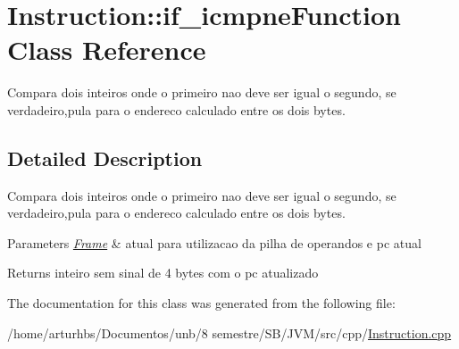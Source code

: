 \hypertarget{classInstruction_1_1if__icmpneFunction}{}\section{Instruction\+:\+:if\+\_\+icmpne\+Function Class Reference}
\label{classInstruction_1_1if__icmpneFunction}


Compara dois inteiros onde o primeiro nao deve ser igual o segundo, se verdadeiro,pula para o endereco calculado entre os dois bytes.  




\subsection{Detailed Description}
Compara dois inteiros onde o primeiro nao deve ser igual o segundo, se verdadeiro,pula para o endereco calculado entre os dois bytes. 


\begin{DoxyParams}{Parameters}
{\em \hyperlink{classFrame}{Frame}} & atual para utilizacao da pilha de operandos e pc atual \\
\hline
\end{DoxyParams}
\begin{DoxyReturn}{Returns}
inteiro sem sinal de 4 bytes com o pc atualizado 
\end{DoxyReturn}


The documentation for this class was generated from the following file\+:\begin{DoxyCompactItemize}
\item 
/home/arturhbs/\+Documentos/unb/8 semestre/\+S\+B/\+J\+V\+M/src/cpp/\hyperlink{Instruction_8cpp}{Instruction.\+cpp}\end{DoxyCompactItemize}
